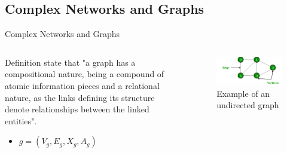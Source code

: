 \documentclass[xcolor=dvipsnames,table]{beamer}
\begin{document}
\subsection{Complex Networks and Graphs}
\begin{frame}{Complex Networks and Graphs}
        \begin{columns}
                \begin{block}{Definition}
                        \citealp{Bacciu_2020} state that "a graph has a compositional nature, being 
                        a compound of atomic information pieces and a relational nature, as the links
                        defining its structure denote relationships between the linked entities".

                        \begin{itemize}
                                \item \textit{$g = (V_g, E_g, X_g, A_g)$}
                        \end{itemize}
                \end{block}
                \centering
                \begin{figure}[H]
                        \centering
                        \includegraphics[scale=0.35]{images/undirectedgraph.png}
                        \caption{Example of an undirected graph}
                \end{figure}
        \end{columns}
\end{frame}
\end{document}
